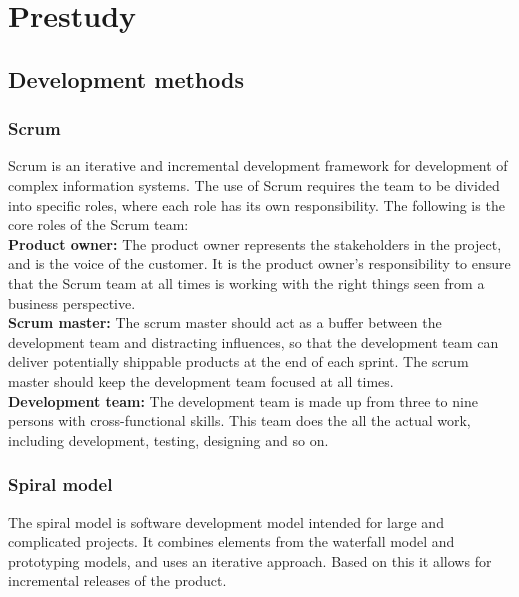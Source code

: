 \section{Prestudy}
\subsection{Development methods}
\subsubsection{Scrum}
Scrum is an iterative and incremental development framework for development of complex information systems. The use of Scrum requires the team to be divided into specific roles, where each role has its own responsibility. The following is the core roles of the Scrum team:\\
{\bf Product owner:} The product owner represents the stakeholders in the project, and is the voice of the customer. It is the product owner’s responsibility to ensure that the Scrum team at all times is working with the right things seen from a business perspective.\\
{\bf Scrum master:} The scrum master should act as a buffer between the development team and distracting influences, so that the development team can deliver potentially shippable products at the end of each sprint. The scrum master should keep the development team focused at all times.\\
{\bf Development team:} The development team is made up from three to nine persons with cross-functional skills. This team does the all the actual work, including development, testing, designing and so on.

\subsubsection{Spiral model}
The spiral model is software development model intended for large and complicated projects. It combines elements from the waterfall model and prototyping models, and uses an iterative approach. Based on this it allows for incremental releases of the product.

